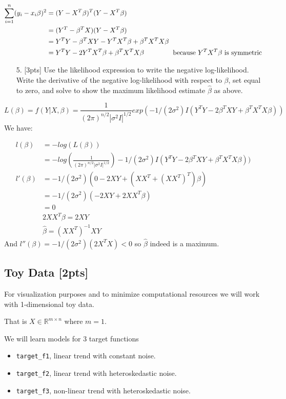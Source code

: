 \documentclass[12pt,a4paper]{article}
\begin{document}
\begin{align}
\sum_{i=1}^n(y_i-x_i\beta)^2
&=(Y-X^T\beta)^T(Y-X^T\beta) \\
&=(Y^T-\beta^TX)(Y-X^T\beta)\\
&=Y^TY-\beta^TXY-Y^TX^T\beta+\beta^TX^TX\beta \\
&=Y^TY-2Y^TX^T\beta+\beta^TX^TX\beta\hspace{15mm}\text{because $Y^TX^T\beta$ is symmetric}
\end{align}
\begin{itemize}
\item[5. ] [3pts] Use the likelihood expression to write the negative log-likelihood.  Write the derivative of the negative log-likelihood with respect to $\beta$, set equal to zero, and solve to show the maximum likelihood estimate $\hat\beta$ as above.

\end{itemize}
\[
L(\beta) = f(Y|X,\beta) =
\frac{1}{(2\pi)^{n/2}|\sigma^2I|^{1/2}}exp(-1/(2\sigma^2)I(Y^TY-2\beta^TXY+\beta^TX^TX\beta))
\]
We have:


\begin{align}
l(\beta) &= -log(L(\beta))\\
& = -log(\frac{1}{(2\pi)^{n/2}|\sigma^2I|^{1/2}})
-1/(2\sigma^2)I(Y^TY-2\beta^TXY+\beta^TX^TX\beta))\\
l'(\beta)&= -1/(2\sigma^2)(0-2XY+(XX^T+(XX^T)^T)\beta)\\
&=-1/(2\sigma^2)(-2XY+2XX^T\beta)\\
&=0\\
&2XX^T\beta=2XY\\
&\hat{\beta} = (XX^T)^{-1}XY
\end{align}
And $l''(\beta) = -1/(2\sigma^2)(2X^TX) < 0$ so $\hat{\beta}$ indeed is a maximum.

\subsection{Toy Data [2pts]}
For visualization purposes and to minimize computational resources we will work with 1-dimensional toy data.

That is $X \in \mathbb{R}^{m \times n}$ where $m=1$.

We will learn models for 3 target functions

\begin{itemize}
\item \texttt{target\_f1}, linear trend with constant noise.


\item \texttt{target\_f2}, linear trend with heteroskedastic noise.


\item \texttt{target\_f3}, non-linear trend with heteroskedastic noise.

\end{itemize}
\end{document}
